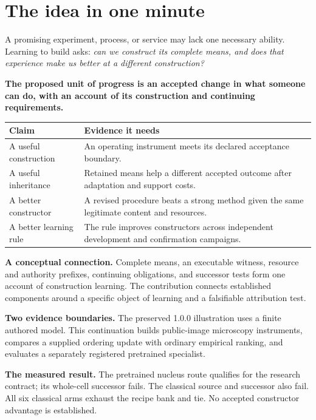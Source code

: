 \section*{The idea in one minute}

A promising experiment, process, or service may lack one necessary ability. Learning to build asks: \emph{can we construct its complete means, and does that experience make us better at a different construction?}

\begin{thesisbox}
\textbf{The proposed unit of progress is an accepted change in what someone can do, with an account of its construction and continuing requirements.}
\end{thesisbox}

\begin{tabularx}{\linewidth}{@{}P{1.5in}Y@{}}
\toprule
\textbf{Claim} & \textbf{Evidence it needs}\\
\midrule
A useful construction & An operating instrument meets its declared acceptance boundary.\\
A useful inheritance & Retained means help a different accepted outcome after adaptation and support costs.\\
A better constructor & A revised procedure beats a strong method given the same legitimate content and resources.\\
A better learning rule & The rule improves constructors across independent development and confirmation campaigns.\\
\bottomrule
\end{tabularx}

\textbf{A conceptual connection.} Complete means, an executable witness, resource and authority prefixes, continuing obligations, and successor tests form one account of construction learning. The contribution connects established components around a specific object of learning and a falsifiable attribution test.

\textbf{Two evidence boundaries.} The preserved 1.0.0 illustration uses a finite authored model. This continuation builds public-image microscopy instruments, compares a supplied ordering update with ordinary empirical ranking, and evaluates a separately registered pretrained specialist.

\textbf{The measured result.} The pretrained nucleus route qualifies for the research contract; its whole-cell successor fails. The classical source and successor also fail. All six classical arms exhaust the recipe bank and tie. No accepted constructor advantage is established.


